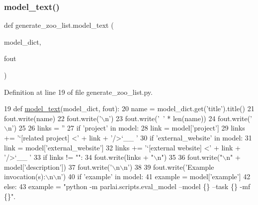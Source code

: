 \subsubsection{\texorpdfstring{model\+\_\+text()}{model\_text()}}
{\footnotesize\ttfamily def generate\+\_\+zoo\+\_\+list.\+model\+\_\+text (\begin{DoxyParamCaption}\item[{}]{model\+\_\+dict,  }\item[{}]{fout }\end{DoxyParamCaption})}



Definition at line 19 of file generate\+\_\+zoo\+\_\+list.\+py.


\begin{DoxyCode}
19 \textcolor{keyword}{def }\hyperlink{namespacegenerate__zoo__list_a453b31f7a899a2ab380b3c1d84ad9b89}{model\_text}(model\_dict, fout):
20     name = model\_dict.get(\textcolor{stringliteral}{'title'}).title()
21     fout.write(name)
22     fout.write(\textcolor{stringliteral}{'\(\backslash\)n'})
23     fout.write(\textcolor{stringliteral}{'~'} * len(name))
24     fout.write(\textcolor{stringliteral}{'\(\backslash\)n'})
25 
26     links = \textcolor{stringliteral}{''}
27     \textcolor{keywordflow}{if} \textcolor{stringliteral}{'project'} \textcolor{keywordflow}{in} model:
28         link = model[\textcolor{stringliteral}{'project'}]
29         links += \textcolor{stringliteral}{'`[related project] <'} + link + \textcolor{stringliteral}{'/>`\_\_ '}
30     \textcolor{keywordflow}{if} \textcolor{stringliteral}{'external\_website'} \textcolor{keywordflow}{in} model:
31         link = model[\textcolor{stringliteral}{'external\_website'}]
32         links += \textcolor{stringliteral}{'`[external website] <'} + link + \textcolor{stringliteral}{'/>`\_\_ '}
33     \textcolor{keywordflow}{if} links != \textcolor{stringliteral}{""}:
34         fout.write(links + \textcolor{stringliteral}{"\(\backslash\)n"})
35 
36     fout.write(\textcolor{stringliteral}{"\(\backslash\)n"} + model[\textcolor{stringliteral}{'description'}])
37     fout.write(\textcolor{stringliteral}{'\(\backslash\)n\(\backslash\)n'})
38 
39     fout.write(\textcolor{stringliteral}{'Example invocation(s):\(\backslash\)n\(\backslash\)n'})
40     \textcolor{keywordflow}{if} \textcolor{stringliteral}{'example'} \textcolor{keywordflow}{in} model:
41         example = model[\textcolor{stringliteral}{'example'}]
42     \textcolor{keywordflow}{else}:
43         example = \textcolor{stringliteral}{"python -m parlai.scripts.eval\_model --model \{\} --task \{\} -mf \{\}"}.

\end{DoxyCode}
